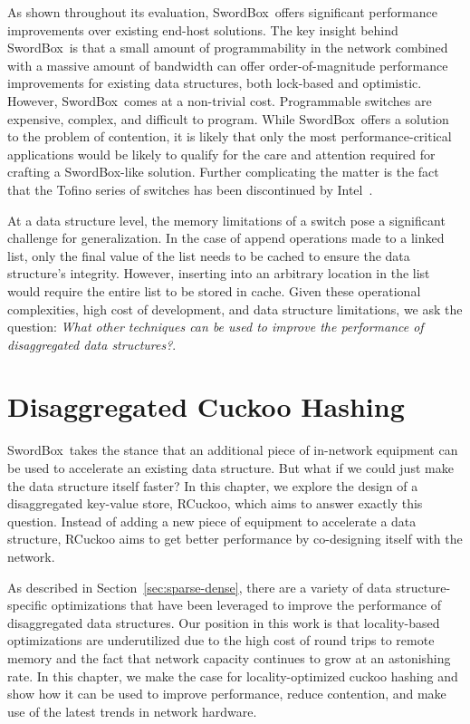 \documentclass[12pt]{ucsddissertation}
\newcommand{\sword}{SwordBox}
\begin{document}
As shown throughout its evaluation, \sword\ offers significant performance improvements over
existing end-host solutions. The key insight behind \sword\ is that a small amount of
programmability in the network combined with a massive amount of bandwidth can offer
order-of-magnitude performance improvements for existing data structures, both lock-based and
optimistic. However, \sword\ comes at a non-trivial cost. Programmable switches are expensive,
complex, and difficult to program. While \sword\ offers a solution to the problem of contention, it
is likely that only the most performance-critical applications would be likely to qualify for the
care and attention required for crafting a \sword-like solution. Further complicating the matter is
the fact that the Tofino series of switches has been discontinued by Intel~\cite{tofino-cancelled}.

At a data structure level, the memory limitations of a switch pose a significant challenge for
generalization. In the case of append operations made to a linked list, only the final value of the
list needs to be cached to ensure the data structure's integrity. However, inserting into an
arbitrary location in the list would require the entire list to be stored in cache. Given these
operational complexities, high cost of development, and data structure limitations, we ask the
question: \textit{What other techniques can be used to improve the performance of disaggregated data
structures?}.


\chapter{Disaggregated Cuckoo Hashing}
\label{chap:rcuckoo}


\sword\ takes the stance that an additional piece of in-network equipment can be used to accelerate
an existing data structure. But what if we could just make the data structure itself faster? In this
chapter, we explore the design of a disaggregated key-value store, RCuckoo, which aims to answer
exactly this question. Instead of adding a new piece of equipment to accelerate a data structure,
RCuckoo aims to get better performance by co-designing itself with the network.

As described in Section~\ref{sec:sparse-dense}, there are a variety of data structure-specific
optimizations that have been leveraged to improve the performance of disaggregated data structures.
Our position in this work is that locality-based optimizations are underutilized due to the high
cost of round trips to remote memory and the fact that network capacity continues to grow at an
astonishing rate. In this chapter, we make the case for locality-optimized cuckoo hashing and show
how it can be used to improve performance, reduce contention, and make use of the latest trends in
network hardware.
\end{document}
